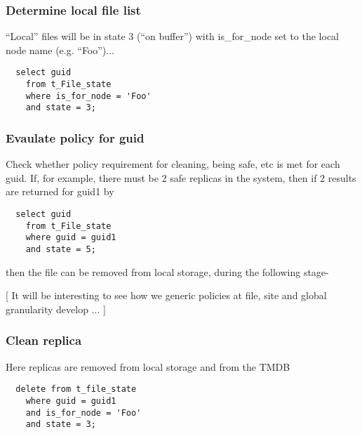 \documentclass{cmspaper}
\begin{document}
\subsubsection{Determine local file list}
``Local'' files will be in state 3 (``on buffer'') with is\_for\_node set to the local node name (e.g. ``Foo'')...

{\small\begin{verbatim}
  select guid
  	from t_File_state
  	where is_for_node = 'Foo'
  	and state = 3;
\end{verbatim}}

\subsubsection{Evaulate policy for guid}
Check whether policy requirement for cleaning, being safe, etc is met for each guid. If, for example, there must be 2 safe replicas in the system, then if 2 results are returned for guid1 by

{\small\begin{verbatim}
  select guid
  	from t_File_state
  	where guid = guid1
  	and state = 5;
\end{verbatim}}

then the file can be removed from local storage, during the following stage-

[ It will be interesting to see how we generic policies at file, site and global granularity develop ... ]

\subsubsection{Clean replica}
Here replicas are removed from local storage and from the TMDB

{\small\begin{verbatim}
  delete from t_file_state
    where guid = guid1
    and is_for_node = 'Foo'
    and state = 3;
\end{verbatim}}
\end{document}
